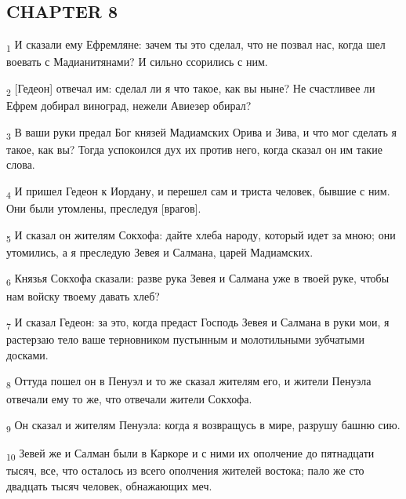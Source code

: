 \subsection{CHAPTER 8}
\begin{tcolorbox}
\textsubscript{1} И сказали ему Ефремляне: зачем ты это сделал, что не позвал нас, когда шел воевать с Мадианитянами? И сильно ссорились с ним.
\end{tcolorbox}
\begin{tcolorbox}
\textsubscript{2} [Гедеон] отвечал им: сделал ли я что такое, как вы ныне? Не счастливее ли Ефрем добирал виноград, нежели Авиезер обирал?
\end{tcolorbox}
\begin{tcolorbox}
\textsubscript{3} В ваши руки предал Бог князей Мадиамских Орива и Зива, и что мог сделать я такое, как вы? Тогда успокоился дух их против него, когда сказал он им такие слова.
\end{tcolorbox}
\begin{tcolorbox}
\textsubscript{4} И пришел Гедеон к Иордану, и перешел сам и триста человек, бывшие с ним. Они были утомлены, преследуя [врагов].
\end{tcolorbox}
\begin{tcolorbox}
\textsubscript{5} И сказал он жителям Сокхофа: дайте хлеба народу, который идет за мною; они утомились, а я преследую Зевея и Салмана, царей Мадиамских.
\end{tcolorbox}
\begin{tcolorbox}
\textsubscript{6} Князья Сокхофа сказали: разве рука Зевея и Салмана уже в твоей руке, чтобы нам войску твоему давать хлеб?
\end{tcolorbox}
\begin{tcolorbox}
\textsubscript{7} И сказал Гедеон: за это, когда предаст Господь Зевея и Салмана в руки мои, я растерзаю тело ваше терновником пустынным и молотильными зубчатыми досками.
\end{tcolorbox}
\begin{tcolorbox}
\textsubscript{8} Оттуда пошел он в Пенуэл и то же сказал жителям его, и жители Пенуэла отвечали ему то же, что отвечали жители Сокхофа.
\end{tcolorbox}
\begin{tcolorbox}
\textsubscript{9} Он сказал и жителям Пенуэла: когда я возвращусь в мире, разрушу башню сию.
\end{tcolorbox}
\begin{tcolorbox}
\textsubscript{10} Зевей же и Салман были в Каркоре и с ними их ополчение до пятнадцати тысяч, все, что осталось из всего ополчения жителей востока; пало же сто двадцать тысяч человек, обнажающих меч.
\end{tcolorbox}
